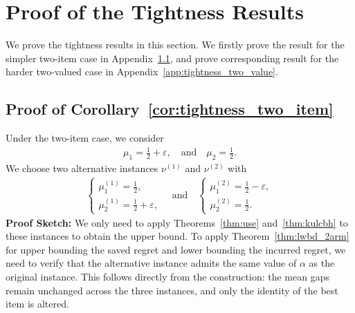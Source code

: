 \documentclass[twoside,11pt]{article}
\begin{document}
\section{Proof of the Tightness Results}
We prove the tightness results in this section. We firstly prove the result for the simpler two-item case in Appendix~\ref{app:tigntness_two_item}, and prove corresponding result for the harder two-valued case in Appendix~\ref{app:tightness_two_value}.
\subsection{Proof of Corollary~\ref{cor:tightness_two_item}}\label{app:tigntness_two_item}
Under the two-item case, we consider
\begin{align}\label{equ:two_item_instance}
    \mu_1 = \frac{1}{2}+\varepsilon, 
    \quad\mbox{and}\quad
    \mu_2 = \frac{1}{2}.
\end{align}
We choose two alternative instances $\nu^{(1)} $ and $\nu^{(2)} $ with
\begin{align}
    \begin{cases}
        \mu_1^{(1)} = \frac{1}{2},\\
        \mu_2^{(1)} = \frac{1}{2}+\varepsilon,
    \end{cases}
    \quad\mbox{and}\quad
    \begin{cases}
        \mu_1^{(2)} = \frac{1}{2}-\varepsilon,\\
        \mu_2^{(2)} = \frac{1}{2}.
    \end{cases}
\end{align}
\textbf{Proof Sketch:} 
We only need to apply Theorems~\ref{thm:use} and~\ref{thm:kulcbh} to these instances to obtain the upper bound.
To apply Theorem~\ref{thm:lwbd_2arm} for upper bounding the saved regret and lower bounding the incurred regret, we need to verify that the alternative instance admits the same value of $\alpha$ as the original instance. This follows directly from the construction: the mean gaps remain unchanged across the three instances, and only the identity of the best item is altered.
\end{document}
